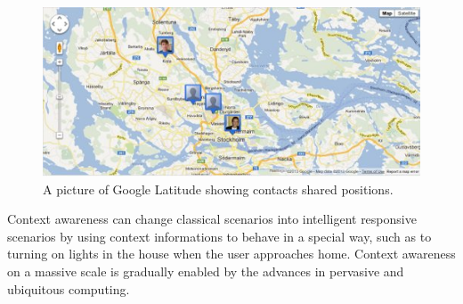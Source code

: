 \begin{figure}[t] %
	\centering
    	\includegraphics[scale=0.75]{part_2/context_awareness/latitude_pic.jpg}
		\caption{A picture of Google Latitude showing contacts shared positions.} 
		\label{googlelat}
\end{figure}

Context awareness can change classical scenarios into intelligent responsive scenarios by using context informations to behave in a special way, such as to turning on lights in the house when the user approaches home. Context awareness on a massive scale is gradually enabled by the advances in pervasive and ubiquitous computing.

